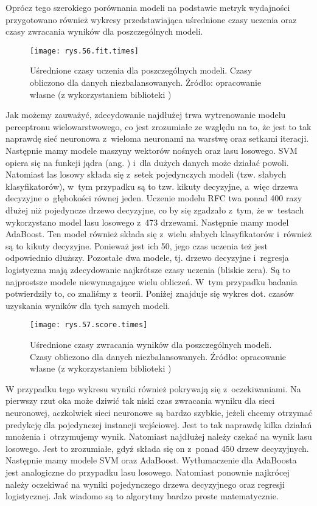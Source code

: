 Oprócz tego szerokiego porównania modeli na podstawie metryk wydajności przygotowano również wykresy przedstawiająca uśrednione czasy uczenia oraz czasy zwracania wyników dla poszczególnych modeli. 
\begin{figure}[!h]
    \centering
    \texttt{[image: rys.56.fit.times]}
    \caption{Uśrednione czasy uczenia dla poszczególnych modeli. Czasy obliczono dla danych niezbalansowanych. Źródło: opracowanie własne (z wykorzystaniem biblioteki )}
    \label{rys.56.fit.times}
\end{figure}
Jak możemy zauważyć, zdecydowanie najdłużej trwa wytrenowanie modelu perceptronu wielowarstwowego, co jest zrozumiałe ze względu na to, że jest to tak naprawdę sieć neuronowa z~wieloma neuronami na warstwę oraz setkami iteracji. Następnie mamy modele maszyny wektorów nośnych oraz lasu losowego. SVM opiera się na funkcji jądra (ang. ) i~dla dużych danych może działać powoli. Natomiast las losowy składa się z~setek pojedynczych modeli (tzw. słabych klasyfikatorów), w~tym przypadku są to tzw. kikuty decyzyjne, a~więc drzewa decyzyjne o~głębokości równej jeden. Uczenie modelu RFC twa ponad 400 razy dłużej niż pojedyncze drzewo decyzyjne, co by się zgadzało z~tym, że w~testach wykorzystano model lasu losowego z~473 drzewami. Następnie mamy model AdaBoost. Ten model również składa się z~wielu słabych klasyfikatorów i~również są to kikuty decyzyjne. Ponieważ jest ich 50, jego czas uczenia też jest odpowiednio dłuższy. Pozostałe dwa modele, tj. drzewo decyzyjne i~regresja logistyczna mają zdecydowanie najkrótsze czasy uczenia (bliskie zera). Są to najprostsze modele niewymagające wielu obliczeń. W~tym przypadku badania potwierdziły to, co znaliśmy z~teorii. Poniżej znajduje się wykres dot. czasów uzyskania wyników dla tych samych modeli.
\begin{figure}[!h]
    \centering
    \texttt{[image: rys.57.score.times]}
    \caption{Uśrednione czasy zwracania wyników dla poszczególnych modeli. Czasy obliczono dla danych niezbalansowanych. Źródło: opracowanie własne (z wykorzystaniem biblioteki )}
    \label{rys.57.score.times}
\end{figure}
W przypadku tego wykresu wyniki również pokrywają się z~oczekiwaniami. Na pierwszy rzut oka może dziwić tak niski czas zwracania wyniku dla sieci neuronowej, aczkolwiek sieci neuronowe są bardzo szybkie, jeżeli chcemy otrzymać predykcję dla pojedynczej instancji wejściowej. Jest to tak naprawdę kilka działań mnożenia i~otrzymujemy wynik. Natomiast najdłużej należy czekać na wynik lasu losowego. Jest to zrozumiałe, gdyż składa się on z~ponad 450 drzew decyzyjnych. Następnie mamy modele SVM oraz AdaBoost. Wytłumaczenie dla AdaBoosta jest analogiczne do przypadku lasu losowego. Natomiast ponownie najkrócej należy oczekiwać na wyniki pojedynczego drzewa decyzyjnego oraz regresji logistycznej. Jak wiadomo są to algorytmy bardzo proste matematycznie.

